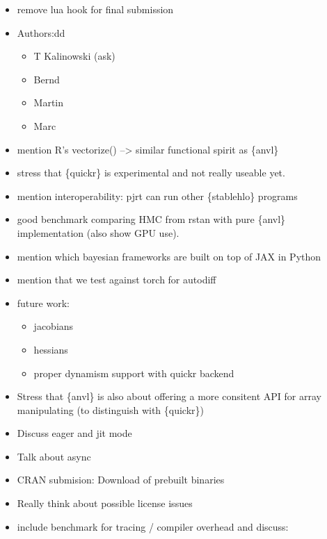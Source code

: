 \begin{itemize}
\tightlist
\item[$\square$]
  remove lua hook for final submission
\item[$\square$]
  Authors:dd

  \begin{itemize}
  \tightlist
  \item[$\square$]
    T Kalinowski (ask)
  \item[$\square$]
    Bernd
  \item[$\square$]
    Martin
  \item[$\square$]
    Marc
  \end{itemize}
\item[$\boxtimes$]
  mention R's vectorize() --\textgreater{} similar functional spirit as \{anvl\}
\item[$\boxtimes$]
  stress that \{quickr\} is experimental and not really useable yet.
\item[$\boxtimes$]
  mention interoperability: pjrt can run other \{stablehlo\} programs
\item[$\square$]
  good benchmark comparing HMC from rstan with pure \{anvl\} implementation (also show GPU use).
\item[$\boxtimes$]
  mention which bayesian frameworks are built on top of JAX in Python
\item[$\boxtimes$]
  mention that we test against torch for autodiff
\item[$\boxtimes$]
  future work:

  \begin{itemize}
  \tightlist
  \item[$\boxtimes$]
    jacobians
  \item[$\boxtimes$]
    hessians
  \item[$\boxtimes$]
    proper dynamism support with quickr backend
  \end{itemize}
\item[$\boxtimes$]
  Stress that \{anvl\} is also about offering a more consitent API for array manipulating (to distinguish with \{quickr\})
\item[$\boxtimes$]
  Discuss eager and jit mode
\item[$\boxtimes$]
  Talk about async
\item[$\square$]
  CRAN submision: Download of prebuilt binaries
\item[$\square$]
  Really think about possible license issues
\item[$\square$]
  include benchmark for tracing / compiler overhead and discuss:


\end{itemize}
